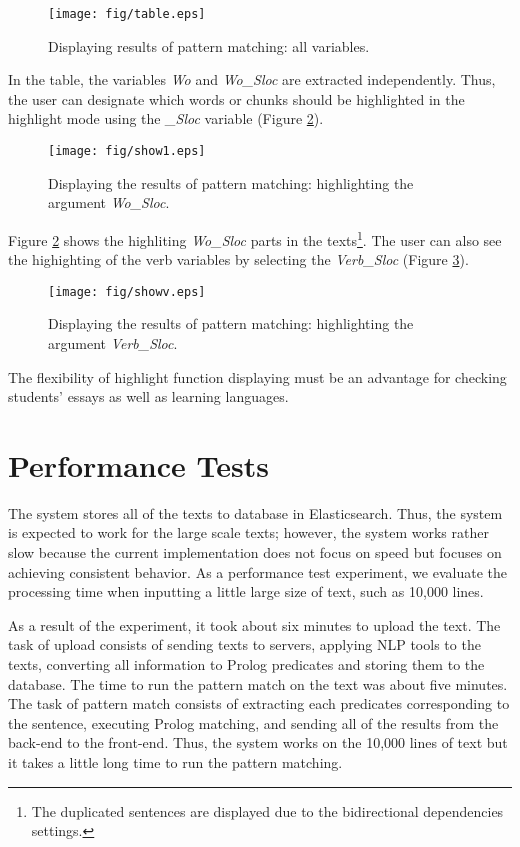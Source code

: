\documentclass[conference]{IEEEtran}
\begin{document}
\begin{figure}[htbp]
  \centerline{\texttt{[image: fig/table.eps]}}
  \caption{Displaying results of pattern matching: all variables.}
  \label{fig:table}
\end{figure}

In the table, the variables {\it Wo} and {\it Wo\_Sloc} are extracted
independently. Thus, the user can designate which words or chunks should be highlighted in
the highlight mode using the {\it \_Sloc} variable (Figure \ref{fig:show1}).

\begin{figure}[htbp]
  \centerline{\texttt{[image: fig/show1.eps]}}
  \caption{Displaying the results of pattern matching: highlighting the argument {\it Wo\_Sloc}.}
  \label{fig:show1}
\end{figure}

Figure \ref{fig:show1} shows the highliting {\it Wo\_Sloc} parts in the texts\footnote{The duplicated
  sentences are displayed due to the bidirectional dependencies settings.}.
The user can also see the highighting of the verb variables by selecting the {\it Verb\_Sloc} (Figure \ref{fig:showv}).

\begin{figure}[htbp]
  \centerline{\texttt{[image: fig/showv.eps]}}
  \caption{Displaying the results of pattern matching: highlighting the argument {\it Verb\_Sloc}.}
  \label{fig:showv}
\end{figure}

The flexibility of highlight function displaying must be an advantage for checking students' essays as well as
learning languages.

\section{Performance Tests}
\label{sec:experiment}
The system stores all of the texts to database in Elasticsearch. Thus,
the system is expected to work for the large scale texts; however, the
system works rather slow because the current implementation does not
focus on speed but focuses on achieving consistent behavior.  As a
performance test experiment, we evaluate the processing time when
inputting a little large size of text, such as 10,000 lines.

As a result of the experiment, it took about six minutes to upload the text.
The task of upload consists of sending texts to servers, applying NLP tools
to the texts, converting all information to Prolog predicates and storing them
to the database.
The time to run the pattern match on the text was about five minutes.
The task of pattern match consists of extracting each predicates corresponding to the sentence,
executing Prolog matching, and sending all of the results from the back-end to the front-end.
Thus, the system works on the 10,000 lines of text but it takes a little long time to run
the pattern matching.
\end{document}
